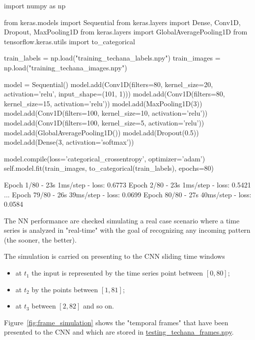\begin{ipythonnon}
import numpy as np

from keras.models import Sequential
from keras.layers import Dense, Conv1D, Dropout, MaxPooling1D
from keras.layers import GlobalAveragePooling1D
from tensorflow.keras.utils import to_categorical

train_labels = np.load("training_techana_labels.npy")
train_images = np.load("training_techana_images.npy")

model = Sequential()
model.add(Conv1D(filters=80, kernel_size=20, 
activation='relu', input_shape=(101, 1)))
model.add(Conv1D(filters=80, kernel_size=15, activation='relu')) 
model.add(MaxPooling1D(3))
model.add(Conv1D(filters=100, kernel_size=10, activation='relu'))
model.add(Conv1D(filters=100, kernel_size=5, activation='relu'))
model.add(GlobalAveragePooling1D())
model.add(Dropout(0.5))
model.add(Dense(3, activation='softmax'))

model.compile(loss='categorical_crossentropy', optimizer='adam')
self.model.fit(train_images, to_categorical(train_labels), epochs=80)
\end{ipythonnon}
\begin{ioutput}
Epoch 1/80
- 23s 1ms/step - loss: 0.6773
Epoch 2/80
- 23s 1ms/step - loss: 0.5421
...
Epoch 79/80
- 26s 39ms/step - loss: 0.0699
Epoch 80/80
- 27s 40ms/step - loss: 0.0584
\end{ioutput}

The NN performance are checked simulating a real case scenario where a time series is analyzed in "real-time" with the goal of recognizing any incoming pattern (the sooner, the better). 

The simulation is carried on presenting to the CNN sliding time windows
\begin{itemize}
	\item at $t_1$ the input is represented by the time series point between \([0, 80]\);
	\item at $t_2$ by the points between \([1, 81]\);
	\item at $t_3$ between \([2, 82]\) and so on.
\end{itemize}

Figure~\ref{fig:frame_simulation} shows the "temporal frames" that have been presented to the CNN and which are stored in \href{https://drive.google.com/file/d/1924W_OiOYmFQ53sCirG-k3FyekgUl9Wr/view?usp=sharing}{testing\_techana\_frames.npy}.

